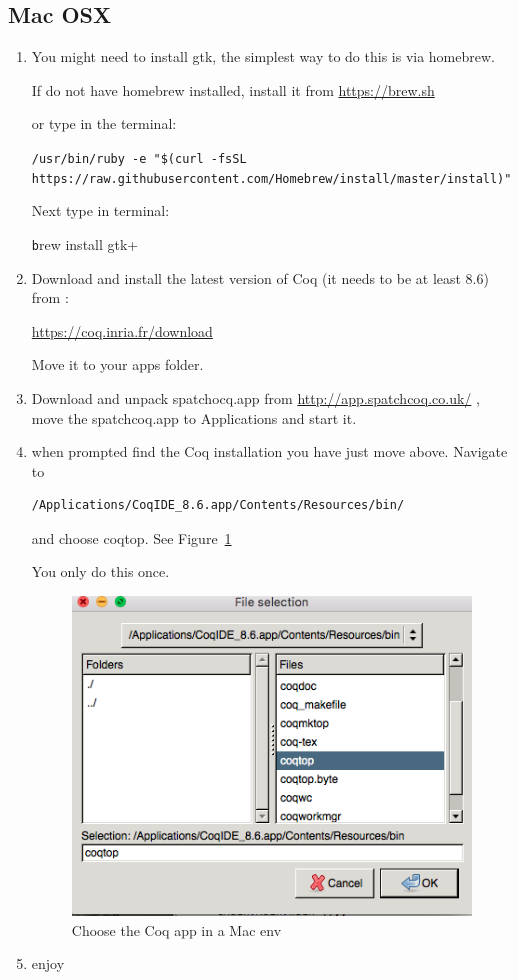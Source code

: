 \subsection{Mac OSX}
\begin{enumerate}



\item   You might  need to install gtk, the simplest way to do this is  via homebrew.

If do not have homebrew installed,  install it from 
\url{https://brew.sh}

or  type in the terminal:

{\small \texttt{/usr/bin/ruby -e "\$(curl -fsSL https://raw.githubusercontent.com/Homebrew/install/master/install)"}

Next type in terminal:

{\center \texttt brew install gtk+}}


\item Download and install  the latest version of Coq (it needs to be at least 8.6) from :

\url{https://coq.inria.fr/download}


Move it to your apps folder.


\item  Download and unpack spatchocq.app from 
\url{http://app.spatchcoq.co.uk/} , move the spatchcoq.app to Applications and start it. 

\item when prompted find the Coq installation you have just move above. Navigate to 
\begin{verbatim}
/Applications/CoqIDE_8.6.app/Contents/Resources/bin/
\end{verbatim}
and choose coqtop. See Figure~\ref{fig:macos}

You only do this once.

\begin{figure}\label{fig:macos}
\center
\includegraphics[scale=0.5]{Installation/macos.png}
\caption{Choose the Coq app in a Mac env}\label{fig:macos}
\end{figure}
\item enjoy

\end{enumerate}

